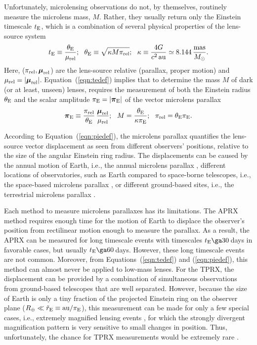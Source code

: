 \documentclass[10pt]{emulateapj}
\newcommand{\pivec}{\mbox{\boldmath $\pi$}}
\newcommand{\muvec}{\mbox{\boldmath $\mu$}}
\begin{document}
 Unfortunately, microlensing observations do not, by themselves, routinely measure the microlens 
mass, $M$. Rather, they usually return only the Einstein timescale $t_{\rm E}$, which is a combination 
of several physical properties of the lens-source system
\begin{equation}
t_{\rm E} \equiv {\theta_{\rm E}\over\mu_{\rm rel}};~~
\theta_{\rm E} \equiv \sqrt{\kappa M \pi_{\rm rel}};~~
\kappa \equiv {4G\over c^2\,{\rm au}}\simeq 8.144\,{{\rm mas}\over M_\odot}.
\label{eqn:tedef}
\end{equation}
Here, ($\pi_{\rm rel}, \muvec_{\rm rel}$) are the lens-source relative
(parallax, proper motion) and $\mu_{\rm rel}=|\muvec_{\rm rel}|$.
Equation~(\ref{eqn:tedef}) implies that to determine the mass $M$
of dark (or at least, unseen) lenses, requires the measurement
of both the Einstein radius $\theta_{\rm E}$ and the
scalar amplitude $\pi_{\rm E}= |\pivec_{\rm E}|$ of the vector microlens parallax
\begin{equation}
\pivec_{\rm E} \equiv {\pi_{\rm rel}\over\theta_{\rm E}}\,{\muvec_{\rm rel}\over \mu_{\rm rel}};~~
M={\theta_{\rm E}\over\kappa\pi_{\rm E}};~~
\pi_{\rm rel} = \theta_{\rm E}\pi_{\rm E}.
\label{eqn:piedef}
\end{equation}

 According to Equation~(\ref{eqn:piedef}), the microlens parallax quantifies the lens-source vector 
displacement as seen from different observers' positions, relative to the size of the angular Einstein 
ring radius. The displacements can be caused by the annual motion of Earth, i.e., the annual microlens 
parallax \citep[hereafter APRX;][]{gould92}, different locations of observatories, such as Earth compared to 
space-borne telescopes, i.e., the space-based microlens parallax \citep[hereafter SPRX;][]{refsdal66}, or different 
ground-based sites, i.e., the terrestrial microlens parallax \citep[hereafter TPRX;][]{gould97}.

 Each method to measure microlens parallaxes has its limitations.
The APRX method \citep{alcock95,mao99,smith02} requires enough time for the motion of Earth 
to displace the observer's position from rectilinear motion enough to measure the parallax. 
As a result, the APRX can be measured for long timescale events with timescales 
$t_{\rm E}\ga30\,$days in favorable cases, but usually $t_{\rm E}\ga60\,$days. However, 
these long timescale events are not common. Moreover, from Equations~(\ref{eqn:tedef}) and 
(\ref{eqn:piedef}), this method can almost never be applied to low-mass lenses. 
For the TPRX, the displacement can be provided by a combination of simultaneous observations 
from ground-based telescopes that are well separated. However, because the size of Earth is 
only a tiny fraction of the projected Einstein ring on the observer plane 
($R_{\oplus} \ll \tilde{r}_{\rm E} \equiv {\rm au}/\pi_{\rm E}$), this measurement can be made 
for only a few special cases, i.e., extremely magnified lensing events \citep{gould09}, 
for which the strongly divergent magnification pattern is very sensitive to small changes 
in position. Thus, unfortunately, the chance for TPRX measurements would be extremely rare 
\citep{gould13}. 
\end{document}
